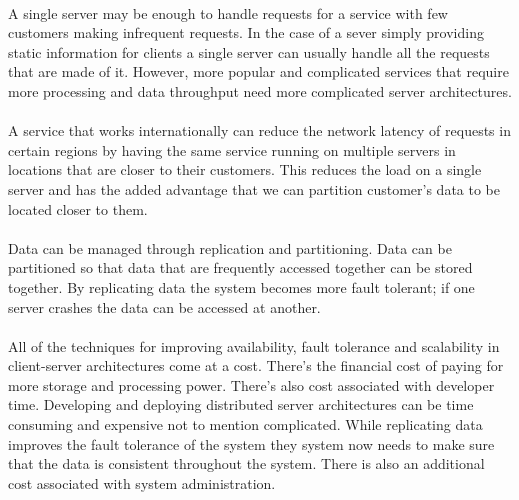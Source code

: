\documentclass[11pt]{amsart}
\begin{document}
\paragraph{}
A single server may be enough to handle requests for a service with few customers making infrequent requests. In the case of a sever simply providing static information for clients a single server can usually handle all the requests that are made of it. However, more popular and complicated services that require more processing and data throughput need more complicated server architectures.

\paragraph{}
 A service that works internationally can reduce the network latency of requests in certain regions by having the same service running on multiple servers in locations that are closer to their customers. This reduces the load on a single server and has the added advantage that we can partition customer's data to be located closer to them.

\paragraph{}
Data can be managed through replication and partitioning. Data can be partitioned so that data that are frequently accessed together can be stored together. By replicating data the system becomes more fault tolerant; if one server crashes the data can be accessed at another.

\paragraph{}
All of the techniques for improving availability, fault tolerance and scalability in client-server architectures come at a cost. There's the financial cost of paying for more storage and processing power. There's also cost associated with developer time. Developing and deploying distributed server architectures can be time consuming and expensive not to mention complicated. While replicating data improves the fault tolerance of the system they system now needs to make sure that the data is consistent throughout the system. There is also an additional cost associated with system administration.\cite{DistSys}

\paragraph{}
\end{document}
